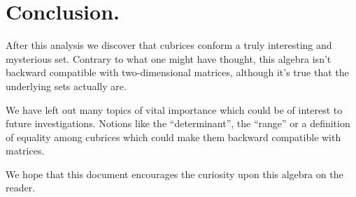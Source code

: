 \section{Conclusion.}

After this analysis we discover that cubrices conform a truly interesting and mysterious set. Contrary to what one might have thought, this algebra isn't backward compatible with two-dimensional matrices, although it's true that the underlying sets actually are.

We have left out many topics of vital importance which could be of interest to future investigations. Notions like the ``determinant'', the ``range'' or a definition of equality among cubrices which could make them backward compatible with matrices.

We hope that this document encourages the curiosity upon this algebra on the reader.
